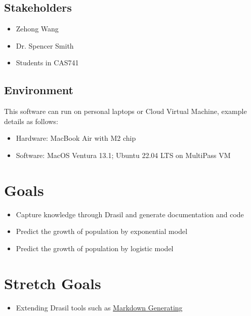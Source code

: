 \documentclass{article}
\begin{document}
\subsection{Stakeholders}
\begin{itemize}
    \item Zehong Wang
    \item Dr. Spencer Smith
    \item Students in CAS741
\end{itemize}

\subsection{Environment}

This software can run on personal laptops or Cloud Virtual Machine, example details as follows:
\begin{itemize}
    \item Hardware: MacBook Air with M2 chip
    \item Software: MacOS Ventura 13.1; Ubuntu 22.04 LTS on MultiPass VM
\end{itemize}

\section{Goals}
\begin{itemize}
    \item Capture knowledge through Drasil and generate documentation and code
    \item Predict the growth of population by exponential model
    \item Predict the growth of population by logistic model 
\end{itemize}

\section{Stretch Goals}
\begin{itemize}
    \item Extending Drasil tools such as \href{https://github.com/JacquesCarette/Drasil/wiki/Potential-Projects#generate-markdown}{Markdown Generating}
\end{itemize}
\end{document}
